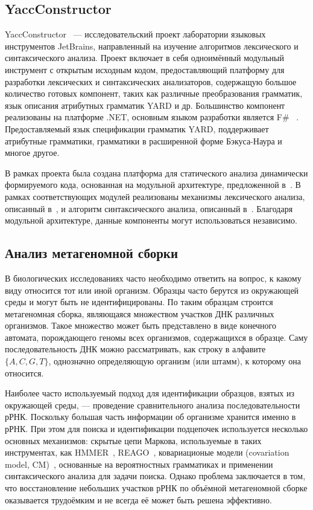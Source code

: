 \subsection{YaccConstructor}
YaccConstructor~\cite{YCUrl} --- исследовательский проект лаборатории языковых инструментов JetBrains, направленный на изучение алгоритмов лексического и синтаксического анализа. Проект включает в себя одноимённый модульный инструмент с открытым исходным кодом, предоставляющий платформу для разработки лексических и синтаксических анализаторов, содержащую большое количество готовых компонент, таких как различные преобразования грамматик, язык описания атрибутных грамматик YARD и др. Большинство компонент реализованы на платформе .NET, основным языком разработки является F\# ~\cite{FSharp}. Предоставляемый язык спецификации грамматик YARD, поддерживает атрибутные грамматики, грамматики в расширенной форме Бэкуса-Наура и многое другое.

В рамках проекта была создана платформа для статического анализа динамически формируемого кода, основанная на модульной архитектуре, предложенной в~\cite{GrigorievPhd}. В рамках соответствующих модулей реализованы механизмы лексического анализа, описанный в~\cite{polubelova}, и алгоритм синтаксического анализа, описанный в~\cite{RelaxedARNGLR}. Благодаря модульной архитектуре, данные компоненты могут использоваться независимо. 

\subsection{Анализ метагеномной сборки}
В биологических исследованиях часто необходимо ответить на вопрос, к какому виду относится тот или иной организм. Образцы часто берутся из окружающей среды и могут быть не идентифицированы. По таким образцам строится метагеномная сборка, являющаяся множеством участков ДНК различных организмов. Такое множество может быть представлено в виде конечного автомата, порождающего геномы всех организмов, содержащихся в образце. Саму последовательность ДНК можно рассматривать, как строку в алфавите $\{A, C, G, T\}$, однозначно определяющую организм (или штамм), к которому она относится. 

Наиболее часто используемый подход для идентификации образцов, взятых из окружающей среды, --- проведение сравнительного анализа последовательности рРНК. Поскольку большая часть информации об организме хранится именно в рРНК. При этом для поиска и идентификации подцепочек используется несколько основных механизмов: скрытые цепи Маркова, используемые в таких инструментах, как HMMER~\cite{hmmer}, REAGO~\cite{reago}, ковариационые модели (covariation model, CM)~\cite{durbin}, основанные на вероятностных грамматиках и применении синтаксического анализа для задачи поиска. Однако проблема заключается в том, что восстановление небольших участков рРНК по объёмной метагеномной сборке оказывается трудоёмким и не всегда её может быть решена эффективно. 

